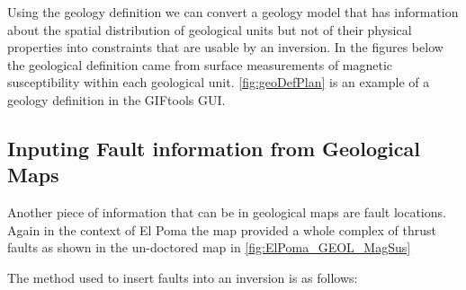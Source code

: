 Using the geology definition we can convert a geology model that has information about the spatial distribution of geological units but not of their physical properties into constraints that are usable by an inversion. In the figures below the geological definition came from surface measurements of magnetic susceptibility within each geological unit. \autoref{fig:geoDefPlan} is an example of a geology definition in the GIFtools GUI.
%

\subsection{Inputing Fault information from Geological Maps}
\label{subsec:Inputing Fault information from Geological Maps}

Another piece of information that can be in geological maps are fault locations. Again in the context of El Poma the map provided a whole complex of thrust faults as shown in the un-doctored map in \autoref{fig:ElPoma_GEOL_MagSus}

The method used to insert faults into an inversion is as follows:

